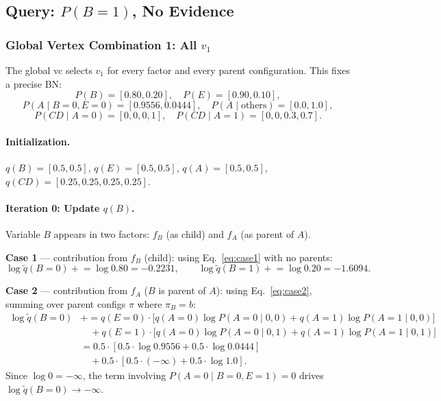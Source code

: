 \documentclass[11pt]{article}
\begin{document}
\subsection{Query: $P(B{=}1)$, No Evidence}

\subsubsection{Global Vertex Combination 1: All $v_1$}

The global vc selects $v_1$ for every factor and every parent configuration.
This fixes a precise BN:
\[
  P(B) = [0.80, 0.20], \quad P(E) = [0.90, 0.10],
\]
\[
  P(A \mid B{=}0, E{=}0) = [0.9556, 0.0444], \quad
  P(A \mid \text{others}) = [0.0, 1.0],
\]
\[
  P(CD \mid A{=}0) = [0, 0, 0, 1], \quad P(CD \mid A{=}1) = [0, 0, 0.3, 0.7].
\]

\paragraph{Initialization.}
$q(B) = [0.5, 0.5]$, $q(E) = [0.5, 0.5]$, $q(A) = [0.5, 0.5]$,
$q(CD) = [0.25, 0.25, 0.25, 0.25]$.

\paragraph{Iteration 0: Update $q(B)$.}
Variable $B$ appears in two factors: $f_B$ (as child) and $f_A$ (as parent of $A$).

\textbf{Case 1} --- contribution from $f_B$ (child):
using Eq.~\eqref{eq:case1} with no parents:
\[
  \log \tilde{q}(B{=}0) \mathrel{+}= \log 0.80 = -0.2231, \qquad
  \log \tilde{q}(B{=}1) \mathrel{+}= \log 0.20 = -1.6094.
\]

\textbf{Case 2} --- contribution from $f_A$ ($B$ is parent of $A$):
using Eq.~\eqref{eq:case2}, summing over parent configs $\pi$ where $\pi_B = b$:
\begin{align*}
  \log \tilde{q}(B{=}0) &\mathrel{+}=
    q(E{=}0) \cdot \bigl[q(A{=}0) \log P(A{=}0 \mid 0,0) + q(A{=}1) \log P(A{=}1 \mid 0,0)\bigr] \\
    &\quad + q(E{=}1) \cdot \bigl[q(A{=}0) \log P(A{=}0 \mid 0,1) + q(A{=}1) \log P(A{=}1 \mid 0,1)\bigr] \\
  &= 0.5 \cdot [0.5 \cdot \log 0.9556 + 0.5 \cdot \log 0.0444] \\
  &\quad + 0.5 \cdot [0.5 \cdot (-\infty) + 0.5 \cdot \log 1.0].
\end{align*}
Since $\log 0 = -\infty$, the term involving $P(A{=}0 \mid B{=}0, E{=}1) = 0$ drives
$\log \tilde{q}(B{=}0) \to -\infty$.
\end{document}
